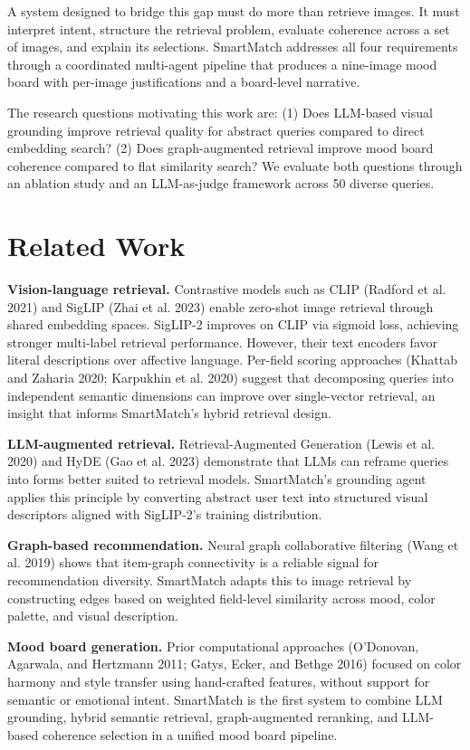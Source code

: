 \documentclass[
  11pt,
]{article}
\begin{document}
A system designed to bridge this gap must do more than retrieve images.
It must interpret intent, structure the retrieval problem, evaluate
coherence across a set of images, and explain its selections. SmartMatch
addresses all four requirements through a coordinated multi-agent
pipeline that produces a nine-image mood board with per-image
justifications and a board-level narrative.

The research questions motivating this work are: (1) Does LLM-based
visual grounding improve retrieval quality for abstract queries compared
to direct embedding search? (2) Does graph-augmented retrieval improve
mood board coherence compared to flat similarity search? We evaluate
both questions through an ablation study and an LLM-as-judge framework
across 50 diverse queries.

\section{Related Work}\label{related-work}

\textbf{Vision-language retrieval.} Contrastive models such as CLIP
(Radford et al. 2021) and SigLIP (Zhai et al. 2023) enable zero-shot
image retrieval through shared embedding spaces. SigLIP-2 improves on
CLIP via sigmoid loss, achieving stronger multi-label retrieval
performance. However, their text encoders favor literal descriptions
over affective language. Per-field scoring approaches (Khattab and
Zaharia 2020; Karpukhin et al. 2020) suggest that decomposing queries
into independent semantic dimensions can improve over single-vector
retrieval, an insight that informs SmartMatch's hybrid retrieval design.

\textbf{LLM-augmented retrieval.} Retrieval-Augmented Generation (Lewis
et al. 2020) and HyDE (Gao et al. 2023) demonstrate that LLMs can
reframe queries into forms better suited to retrieval models.
SmartMatch's grounding agent applies this principle by converting
abstract user text into structured visual descriptors aligned with
SigLIP-2's training distribution.

\textbf{Graph-based recommendation.} Neural graph collaborative
filtering (Wang et al. 2019) shows that item-graph connectivity is a
reliable signal for recommendation diversity. SmartMatch adapts this to
image retrieval by constructing edges based on weighted field-level
similarity across mood, color palette, and visual description.

\textbf{Mood board generation.} Prior computational approaches
(O'Donovan, Agarwala, and Hertzmann 2011; Gatys, Ecker, and Bethge 2016)
focused on color harmony and style transfer using hand-crafted features,
without support for semantic or emotional intent. SmartMatch is the
first system to combine LLM grounding, hybrid semantic retrieval,
graph-augmented reranking, and LLM-based coherence selection in a
unified mood board pipeline.
\end{document}
